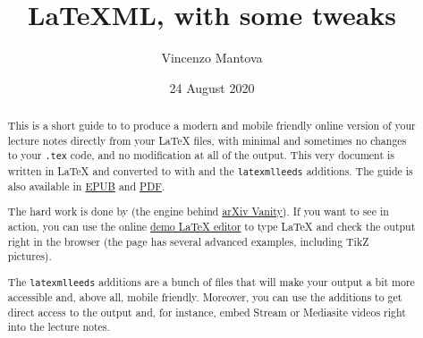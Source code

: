 \documentclass[a4paper]{article}
\title{LaTeXML, with some tweaks}
\author{Vincenzo Mantova}
\date{24 August 2020}
\theoremstyle{definition}
\begin{document}
\maketitle

\begin{abstract}
  This is a short guide to \LaTeXML{} to produce a modern and mobile friendly online version of your lecture notes directly from your \LaTeX{} files, with minimal and sometimes no changes to your \verb|.tex| code, and no modification at all of the \HTML{} output. This very document is written in \LaTeX{} and converted to \HTML{} with \LaTeXML{} and the \verb|latexmlleeds| additions. The guide is also available in \href{LaTeXML-Leeds.epub}{EPUB} and \href{LaTeXML-Leeds.pdf}{PDF}.

  The hard work is done by \LaTeXML{} (the engine behind \href{https://www.arxiv-vanity.com/}{arXiv Vanity}). If you want to see \LaTeXML{} in action, you can use the online \href{https://latexml.mathweb.org/editor}{demo \LaTeX{} editor} to type \LaTeX{} and check the \HTML{} output right in the browser (the page has several advanced examples, including TikZ pictures).

  The \verb|latexmlleeds| additions are a bunch of files that will make your output a bit more accessible and, above all, mobile friendly. Moreover, you can use the additions to get direct access to the \HTML{} output and, for instance, embed Stream or Mediasite videos right into the lecture notes.
  \end{abstract}


\tableofcontents
\end{document}
